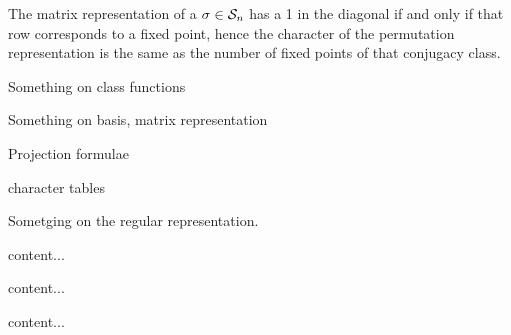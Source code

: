 \begin{example}
	The matrix representation of a $\sigma \in \mathcal{S}_n$ has a 1 in the diagonal if and only if that row corresponds to a fixed point, hence the character of the permutation representation is the same as the number of fixed points of that conjugacy class.
\end{example}
Something on class functions

Something on basis, matrix representation

Projection formulae

character tables 

Sometging on the regular representation.

\begin{example}
	content...
\end{example}

\begin{example}
	content...
\end{example}

\begin{example}
	content...
\end{example}